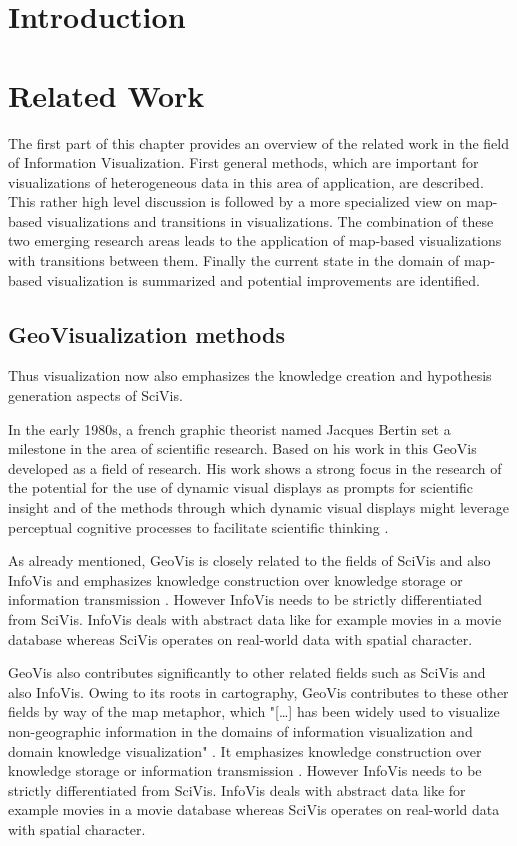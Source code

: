 \section{Introduction}

\section{Related Work}
The first part of this chapter provides an overview of the related work in the field of
Information Visualization. First general methods, which are important for visualizations of heterogeneous data in this area of application, are described. This rather high level discussion is followed by a more specialized view on map-based visualizations and transitions in visualizations. The combination of these two emerging research areas leads to the application of map-based visualizations with transitions between them. Finally the current state in the domain of map-based visualization is summarized and potential improvements are identified.

\subsection{GeoVisualization methods}
 Thus visualization now also emphasizes the knowledge creation and hypothesis generation aspects of \ac{SciVis}.

In the early 1980s, a french graphic theorist named Jacques Bertin set a milestone in the area of scientific research. Based on his work in this \ac{GeoVis} developed as a field of research. His work shows a strong focus in the research of the potential for the use of dynamic visual displays as prompts for scientific insight and of the methods through which dynamic visual displays might leverage perceptual cognitive processes to facilitate scientific thinking .

As already mentioned, \ac{GeoVis} is closely related to the fields of \ac{SciVis} and also \ac{InfoVis} and emphasizes knowledge construction over knowledge storage or information transmission . However \ac{InfoVis} needs to be strictly differentiated from \ac{SciVis}. \ac{InfoVis} deals with abstract data like for example movies in a movie database whereas \ac{SciVis} operates on real-world data with spatial character.

\ac{GeoVis} also contributes significantly to other related fields such as \ac{SciVis} and also \ac{InfoVis}. Owing to its roots in cartography, \ac{GeoVis} contributes to these other fields by way of the map metaphor, which "[\ldots] has been widely used to visualize non-geographic information in the domains of information visualization and domain knowledge visualization" . It emphasizes knowledge construction over knowledge storage or information transmission . However \ac{InfoVis} needs to be strictly differentiated from \ac{SciVis}. \ac{InfoVis} deals with abstract data like for example movies in a movie database whereas \ac{SciVis} operates on real-world data with spatial character.

